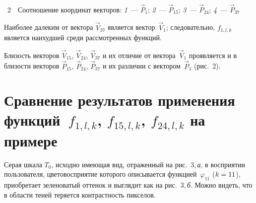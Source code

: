 \begin{multicols}{2}

\vspace*{12pt}

\begin{center}  %
\mbox{%
 \epsfxsize=74.31mm
 }
  \end{center}

  \vspace*{-3pt}

\noindent
{{\figurename~2}\ \ \small{Соотношение координат векторов: \textit{1}~--- $\vec{P}_1$; \textit{2}~--- 
$\vec{P}_{15}$; \textit{3}~--- $\vec{P}_{24}$; \textit{4}~--- $\vec{P}_{37}$}}

\vspace*{12pt}

\addtocounter{figure}{2}

  
  Наиболее далеким от вектора $\vec{V}_{37}$ является вектор~$\vec{V}_1$; 
следовательно, $f_{1,l,k}$ является наихудшей среди рассмотренных функций. 
  


  
  Близость векторов $\vec{V}_{15}$, $\vec{V}_{24}$, $\vec{V}_{37}$ и их 
отличие от вектора~$\vec{V}_1$ проявляется и в близости векторов 
$\vec{P}_{15}$, $\vec{P}_{24}$, $\vec{P}_{37}$ и их различии с 
вектором~$\vec{P}_1$ (рис.~2). 


  
\section{Сравнение результатов применения функций~$f_{1,l,k}$, 
$f_{15,l,k}$, $f_{24,l,k}$ на примере }
  
  Серая шкала $T_0$, исходно имеющая вид, отраженный на рис.~3,\,\textit{а}, 
в восприятии пользователя, цветовосприятие которого описывается 
функцией~$\varphi_{11}$ ($k\hm=11$), приобретает зеленоватый оттенок и 
выглядит как на рис.~3,\,\textit{б}. Можно видеть, что в области теней теряется 
контрастность пикселов.

\setcounter{figure}{5}
\begin{figure*}[b] %
\vspace*{9pt}
 \begin{center}
 \mbox{%
 \epsfxsize=140.833mm
 }
 \end{center}
 \vspace*{-6pt}
\end{figure*}
  

\end{multicols}
